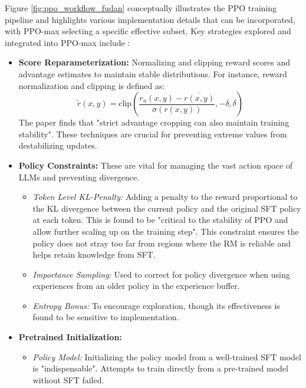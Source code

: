 \documentclass{article}
\begin{document}
Figure \ref{fig:ppo_workflow_fudan} conceptually illustrates the PPO training pipeline and highlights various implementation details that can be incorporated, with PPO-max selecting a specific effective subset. Key strategies explored and integrated into PPO-max include \cite{Zheng2023PPO}:


\begin{itemize}
    \item \textbf{Score Reparameterization:} Normalizing and clipping reward scores and advantage estimates to maintain stable distributions. For instance, reward normalization and clipping is defined as:
    \begin{equation}
        \label{eq:score_reparameterization}
        \tilde{r}(x,y)=\text{clip}\left(\frac{r_{n}(x,y)-\overline{r(x,y)}}{\sigma(r(x,y))},-\delta,\delta\right)
    \end{equation}
    The paper finds that "strict advantage cropping can also maintain training stability". \cite{Zheng2023PPO} These techniques are crucial for preventing extreme values from destabilizing updates.
    \item \textbf{Policy Constraints:} These are vital for managing the vast action space of LLMs and preventing divergence.
        \begin{itemize}
            \item \textit{Token Level KL-Penalty:} Adding a penalty to the reward proportional to the KL divergence between the current policy and the original SFT policy at each token. This is found to be "critical to the stability of PPO and allow further scaling up on the training step". \cite{Zheng2023PPO} This constraint ensures the policy does not stray too far from regions where the RM is reliable and helps retain knowledge from SFT.
            \item \textit{Importance Sampling:} Used to correct for policy divergence when using experiences from an older policy in the experience buffer.
            \item \textit{Entropy Bonus:} To encourage exploration, though its effectiveness is found to be sensitive to implementation.
        \end{itemize}
    \item \textbf{Pretrained Initialization:}
        \begin{itemize}
            \item \textit{Policy Model:} Initializing the policy model from a well-trained SFT model is "indispensable". \cite{Zheng2023PPO} Attempts to train directly from a pre-trained model without SFT failed.

\end{itemize}
\end{itemize}
\end{document}
